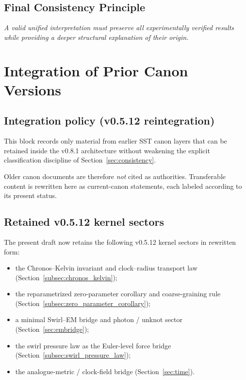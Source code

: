 \documentclass[11pt]{article}
\theoremstyle{definition}
\theoremstyle{plain}
\theoremstyle{remark}
\begin{document}
    \subsection{Final Consistency Principle}
        
        \begin{center}
            \textit{
                A valid unified interpretation must preserve all experimentally verified results while providing a deeper structural explanation of their origin.
            }
        \end{center}

    \section{Integration of Prior Canon Versions}
        \label{sec:integration}

    \subsection{Integration policy (v0.5.12 reintegration)}

        This block records only material from earlier SST canon layers that can be retained inside the v0.8.1 architecture without weakening the explicit classification discipline of Section~\ref{sec:consistency}.

        Older canon documents are therefore \emph{not} cited as authorities. Transferable content is rewritten here as current-canon statements, each labeled according to its present status.

    \subsection{Retained v0.5.12 kernel sectors}

        The present draft now retains the following v0.5.12 kernel sectors in rewritten form:
        \begin{itemize}
            \item the Chronos--Kelvin invariant and clock--radius transport law (Section~\ref{subsec:chronos_kelvin});
            \item the reparametrized zero-parameter corollary and coarse-graining rule (Section~\ref{subsec:zero_parameter_corollary});
            \item a minimal Swirl--EM bridge and photon / unknot sector (Section~\ref{sec:embridge});
            \item the swirl pressure law as the Euler-level force bridge (Section~\ref{subsec:swirl_pressure_law});
            \item the analogue-metric / clock-field bridge (Section~\ref{sec:time}).
        \end{itemize}
\end{document}
